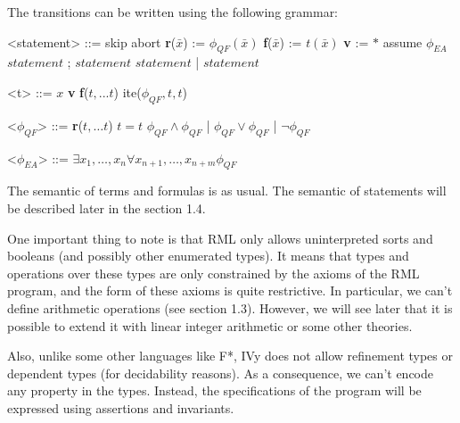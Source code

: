 \documentclass[11pt,a4paper,oldfontcommands,openany]{memoir}
\begin{document}
    The transitions can be written using the following grammar:
    \begin{multicols}{2}
        \begin{grammar}

            <statement> ::= skip
            \alt abort
            \alt \textbf{r}(\(\bar{x}\)) := \( \phi_{QF}(\bar{x}) \)
            \alt \textbf{f}(\(\bar{x}\)) := \( t(\bar{x}) \)
            \alt \textbf{v} := \( * \)
            \alt assume \( \phi_{EA} \)
            \alt \( statement \) ; \( statement \)
            \alt \( statement \) | \( statement \)
            
        \end{grammar}

        \columnbreak

        \begin{grammar}

            <t> ::= \(x\)
            \alt \textbf{v}
            \alt \textbf{f}(\(t,...t\))
            \alt ite(\( \phi_{QF},t,t\))

            <\( \phi_{QF} \)> ::= \textbf{r}(\(t,\ldots t\))
            \alt \( t = t \)
            \alt \( \phi_{QF} \land \phi_{QF} \) \quad | \quad \( \phi_{QF} \lor \phi_{QF} \) \quad | \quad \( \neg \phi_{QF} \)
            
            <\( \phi_{EA} \)> ::= \( \exists x_1,\ldots,x_n \forall x_{n+1},\ldots,x_{n+m} \phi_{QF} \)

        \end{grammar}
    \end{multicols}

    The semantic of terms and formulas is as usual. The semantic of statements will be described later in the section 1.4.

    One important thing to note is that RML only allows uninterpreted sorts and booleans (and possibly other enumerated types).
    It means that types and operations over these types are only constrained by the axioms of the RML program,
    and the form of these axioms is quite restrictive.
    In particular, we can't define arithmetic operations (see section 1.3).
    However, we will see later that it is possible to extend it with linear integer arithmetic or some other theories.

    Also, unlike some other languages like F*, IVy does not allow refinement types or dependent types (for decidability reasons).
    As a consequence, we can't encode any property in the types.
    Instead, the specifications of the program will be expressed using assertions and invariants.
\end{document}
